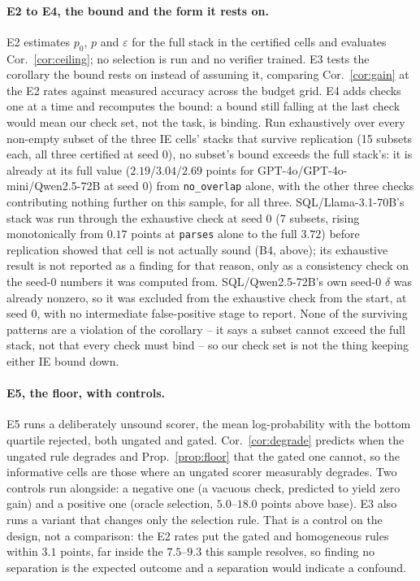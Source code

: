 \documentclass[11pt]{article}
\begin{document}
\paragraph{E2 to E4, the bound and the form it rests on.} E2 estimates $p_0$, $p$ and $\varepsilon$ for the full stack in the certified
cells and evaluates Cor.~\ref{cor:ceiling}; no selection is run and no verifier
trained. E3
tests the corollary the bound rests on instead of assuming it, comparing
Cor.~\ref{cor:gain} at the E2 rates against measured accuracy across the budget
grid. E4 adds checks one at a time and recomputes the bound: a bound still falling at
the last check would mean our check set, not the task, is binding. Run
exhaustively over every non-empty subset of the three IE cells' stacks that
survive replication (15 subsets each, all three certified at seed 0), no
subset's bound exceeds the full stack's: it is already at its full value
($2.19$/$3.04$/$2.69$ points for GPT-4o/GPT-4o-mini/Qwen2.5-72B at seed 0) from
\texttt{no\_overlap} alone, with the other three checks contributing nothing
further on this sample, for all three. SQL/Llama-3.1-70B's stack was run through the
exhaustive check at seed 0 (7 subsets, rising monotonically from
$0.17$ points at \texttt{parses} alone to the full $3.72$) before replication
showed that cell is not actually sound (B4, above); its exhaustive result
is not reported as a finding for that reason, only as a consistency check
on the seed-0 numbers it was computed from. SQL/Qwen2.5-72B's own seed-0
$\delta$ was already nonzero, so it was excluded from the exhaustive check
from the start, at seed 0, with no intermediate false-positive stage to
report. None of the surviving patterns are a
violation of the corollary -- it says a subset cannot exceed the full
stack, not that every check must bind -- so our check set is not the thing
keeping either IE bound down.

\paragraph{E5, the floor, with controls.} E5 runs a deliberately unsound scorer, the mean log-probability with the bottom
quartile rejected, both ungated and gated. Cor.~\ref{cor:degrade} predicts when
the ungated rule degrades and Prop.~\ref{prop:floor} that the gated one cannot,
so the informative cells are those where an ungated scorer measurably degrades. Two controls run alongside: a negative one (a vacuous check, predicted to yield
zero gain) and a positive one (oracle selection, $5.0$--$18.0$ points above
base). E3 also runs a variant that changes only the selection rule. That is a control
on the design, not a comparison: the E2 rates put the gated and homogeneous
rules within $3.1$ points, far inside the $7.5$--$9.3$ this sample resolves, so
finding no separation is the expected outcome and a separation would indicate a
confound.
\end{document}
